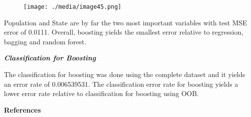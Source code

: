 \documentclass[12pt]{article}
\begin{document}

\begin{figure}[H]
	\begin{Center}
		\texttt{[image: ./media/image45.png]}
	\end{Center}
\end{figure}



\par

\begin{justify}
Population and State are by far the two most important variables with test MSE error of 0.0111. Overall, boosting yields the smallest error relative to regression, bagging and random forest.
\end{justify}\par


\vspace{\baselineskip}

\vspace{\baselineskip}

\vspace{\baselineskip}
\begin{justify}
\textbf{\textit{Classification for Boosting}}
\end{justify}\par

\begin{justify}
The classification for boosting was done using the complete dataset and it yields an error rate of 0.006539531. The classification error rate for boosting yields a lower error rate relative to classification for boosting using OOB.
\end{justify}\par




\newpage

\vspace{\baselineskip}
\vspace{\baselineskip}
\begin{adjustwidth}{2.0in}{0.0in}
\begin{justify}
\textbf{References}
\end{justify}\par

\end{adjustwidth}
\end{document}
